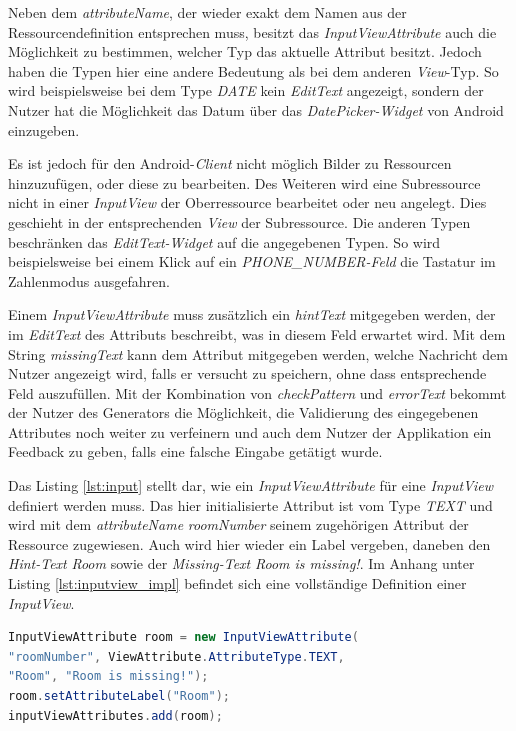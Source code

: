 Neben dem \textit{attributeName}, der wieder exakt dem Namen aus der Ressourcendefinition entsprechen muss, besitzt das \textit{InputViewAttribute} auch die Möglichkeit zu bestimmen, welcher Typ das aktuelle Attribut besitzt. Jedoch haben die Typen hier eine andere Bedeutung als bei dem anderen \textit{View}-Typ. So wird beispielsweise bei dem Type \textit{DATE} kein \textit{EditText} angezeigt, sondern der Nutzer hat die Möglichkeit das Datum über das \textit{DatePicker-Widget} von Android einzugeben. 

Es ist jedoch für den Android-\textit{Client} nicht möglich Bilder zu Ressourcen hinzuzufügen, oder diese zu bearbeiten. Des Weiteren wird eine Subressource nicht in einer \textit{InputView} der Oberressource bearbeitet oder neu angelegt. Dies geschieht in der entsprechenden \textit{View} der Subressource. Die anderen Typen beschränken das \textit{EditText-Widget} auf die angegebenen Typen. So wird beispielsweise bei einem Klick auf ein \textit{PHONE\_NUMBER-Feld} die Tastatur im Zahlenmodus ausgefahren.

Einem \textit{InputViewAttribute} muss zusätzlich ein \textit{hintText} mitgegeben werden, der im \textit{EditText} des Attributs beschreibt, was in diesem Feld erwartet wird. Mit dem String \textit{missingText} kann dem Attribut mitgegeben werden, welche Nachricht dem Nutzer angezeigt wird, falls er versucht zu speichern, ohne dass entsprechende Feld auszufüllen. Mit der Kombination von \textit{checkPattern} und \textit{errorText} bekommt der Nutzer des Generators die Möglichkeit, die Validierung des eingegebenen Attributes noch weiter zu verfeinern und auch dem Nutzer der Applikation ein Feedback zu geben, falls eine falsche Eingabe getätigt wurde.

Das Listing \ref{lst:input} stellt dar, wie ein \textit{InputViewAttribute} für eine \textit{InputView} definiert werden muss. Das hier initialisierte Attribut ist vom Type \textit{TEXT} und wird mit dem \textit{attributeName} \textit{roomNumber} seinem zugehörigen Attribut der Ressource zugewiesen.
Auch wird hier wieder ein Label vergeben, daneben den \textit{Hint-Text} \textit{Room} sowie der \textit{Missing-Text} \textit{Room is missing!}.
Im Anhang unter Listing \ref{lst:inputview_impl} befindet sich eine vollständige Definition einer \textit{InputView}.

\begin{lstlisting}[label=lst:input,
language=java,
firstnumber=1,
caption=Definition eines \textit{InputViewAttributes} einer \textit{InputView}.]	
InputViewAttribute room = new InputViewAttribute(
"roomNumber", ViewAttribute.AttributeType.TEXT, 
"Room", "Room is missing!");
room.setAttributeLabel("Room");
inputViewAttributes.add(room);
\end{lstlisting}

